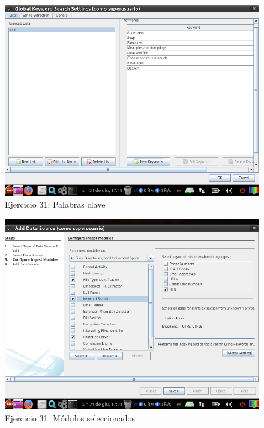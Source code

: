 \documentclass[11pt]{article}
\begin{document}
\begin{figure}[H]
    \caption{Ejercicio 31: Palabras clave}
  \centering
  \includegraphics[scale=0.7]{p02/e31-3.png}
\end{figure}

\begin{figure}[H]
    \caption{Ejercicio 31: Módulos seleccionados}
  \centering
  \includegraphics[scale=0.7]{p02/e31-4.png}
\end{figure}
\end{document}
